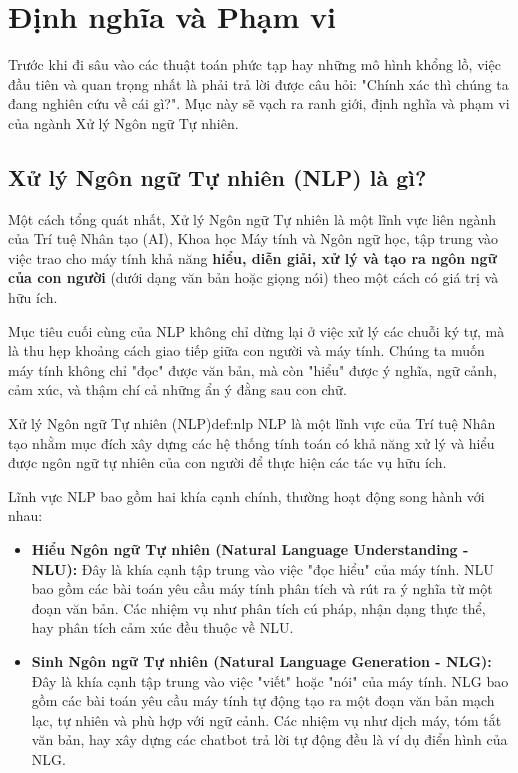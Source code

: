 

\section{Định nghĩa và Phạm vi}
\label{sec:dinh_nghia_pham_vi}

Trước khi đi sâu vào các thuật toán phức tạp hay những mô hình khổng lồ, việc đầu tiên và quan trọng nhất là phải trả lời được câu hỏi: "Chính xác thì chúng ta đang nghiên cứu về cái gì?". Mục này sẽ vạch ra ranh giới, định nghĩa và phạm vi của ngành Xử lý Ngôn ngữ Tự nhiên.

\subsection{Xử lý Ngôn ngữ Tự nhiên (NLP) là gì?}
\label{ssec:nlp_la_gi}

Một cách tổng quát nhất, Xử lý Ngôn ngữ Tự nhiên là một lĩnh vực liên ngành của Trí tuệ Nhân tạo (AI), Khoa học Máy tính và Ngôn ngữ học, tập trung vào việc trao cho máy tính khả năng \textbf{hiểu, diễn giải, xử lý và tạo ra ngôn ngữ của con người} (dưới dạng văn bản hoặc giọng nói) theo một cách có giá trị và hữu ích.

Mục tiêu cuối cùng của NLP không chỉ dừng lại ở việc xử lý các chuỗi ký tự, mà là thu hẹp khoảng cách giao tiếp giữa con người và máy tính. Chúng ta muốn máy tính không chỉ "đọc" được văn bản, mà còn "hiểu" được ý nghĩa, ngữ cảnh, cảm xúc, và thậm chí cả những ẩn ý đằng sau con chữ.

\begin{definition}{Xử lý Ngôn ngữ Tự nhiên (NLP)}{def:nlp}
    NLP là một lĩnh vực của Trí tuệ Nhân tạo nhằm mục đích xây dựng các hệ thống tính toán có khả năng xử lý và hiểu được ngôn ngữ tự nhiên của con người để thực hiện các tác vụ hữu ích.
\end{definition}

Lĩnh vực NLP bao gồm hai khía cạnh chính, thường hoạt động song hành với nhau:

\begin{itemize}
    \item \textbf{Hiểu Ngôn ngữ Tự nhiên (Natural Language Understanding - NLU):} Đây là khía cạnh tập trung vào việc "đọc hiểu" của máy tính. NLU bao gồm các bài toán yêu cầu máy tính phân tích và rút ra ý nghĩa từ một đoạn văn bản. Các nhiệm vụ như phân tích cú pháp, nhận dạng thực thể, hay phân tích cảm xúc đều thuộc về NLU.
    
    \item \textbf{Sinh Ngôn ngữ Tự nhiên (Natural Language Generation - NLG):} Đây là khía cạnh tập trung vào việc "viết" hoặc "nói" của máy tính. NLG bao gồm các bài toán yêu cầu máy tính tự động tạo ra một đoạn văn bản mạch lạc, tự nhiên và phù hợp với ngữ cảnh. Các nhiệm vụ như dịch máy, tóm tắt văn bản, hay xây dựng các chatbot trả lời tự động đều là ví dụ điển hình của NLG.
\end{itemize}

